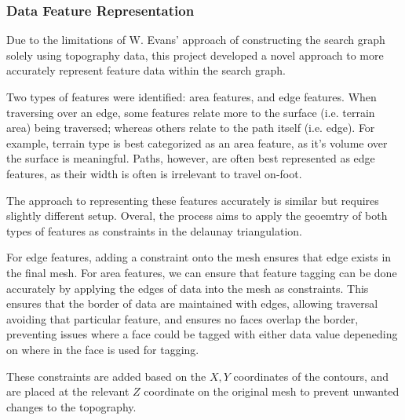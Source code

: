 \documentclass[12pt]{article}
\begin{document}
\subsubsection{Data Feature Representation}


Due to the limitations of W. Evans' approach of constructing the search graph solely using topography data, this project developed a novel approach to more accurately represent feature data within the search graph.

Two types of features were identified: area features, and edge features. When traversing over an edge, some features relate more to the surface (i.e. terrain area) being traversed; whereas others relate to the path itself (i.e. edge). For example, terrain type is best categorized as an area feature, as it's volume over the surface is meaningful. Paths, however, are often best represented as edge features, as their width is often is irrelevant to travel on-foot.

The approach to representing these features accurately is similar but requires slightly different setup. Overal, the process aims to apply the geoemtry of both types of features as constraints in the delaunay triangulation.

For edge features, adding a constraint onto the mesh ensures that edge exists in the final mesh. For area features, we can ensure that feature tagging can be done accurately by applying the edges of data into the mesh as constraints. This ensures that the border of data are maintained with edges, allowing traversal avoiding that particular feature, and ensures no faces overlap the border, preventing issues where a face could be tagged with either data value depeneding on where in the face is used for tagging.

These constraints are added based on the $X,Y$ coordinates of the contours, and are placed at the relevant $Z$ coordinate on the original mesh to prevent unwanted changes to the topography.
\end{document}
